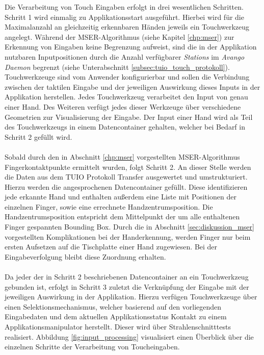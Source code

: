 Die Verarbeitung von Touch Eingaben erfolgt in drei wesentlichen Schritten. Schritt 1 wird einmalig zu Applikationsstart ausgeführt. Hierbei wird für die Maximalanzahl an gleichzeitig erkennbaren Händen jeweils ein Touchwerkzeug angelegt. Während der MSER-Algorithmus (siehe Kapitel \ref{chp:mser}) zur Erkennung von Eingaben keine Begrenzung aufweist, sind die in der Applikation nutzbaren Inputpositionen durch die Anzahl verfügbarer \emph{Stations} im \emph{Avango Daemon} begrenzt (siehe Unterabschnitt \ref{subsec:tuio_touch_protokoll}). Touchwerkzeuge sind vom Anwender konfigurierbar und sollen die Verbindung zwischen der taktilen Eingabe und der jeweiligen Auswirkung dieses Inputs in der Applikation herstellen. Jedes Touchwerkzeug verarbeitet den Input von genau einer Hand. Des Weiteren verfügt jedes dieser Werkzeuge über verschiedene Geometrien zur Visualisierung der Eingabe. Der Input einer Hand wird als Teil des Touchwerkzeugs in einem Datencontainer gehalten, welcher bei Bedarf in Schritt 2 gefüllt wird.
\\\\
Sobald durch den in Abschnitt \ref{chp:mser} vorgestellten MSER-Algorithmus Fingerkontaktpunkte ermittelt wurden, folgt Schritt 2. An dieser Stelle werden die Daten aus dem TUIO Protokoll Transfer ausgewertet und umstrukturiert. Hierzu werden die angesprochenen Datencontainer gefüllt. Diese identifizieren jede erkannte Hand und enthalten außerdem eine Liste mit Positionen der einzelnen Finger, sowie eine errechnete Handzentrumsposition. Die Handzentrumsposition entspricht dem Mittelpunkt der um alle enthaltenen Finger gespannten Bounding Box. Durch die in Abschnitt \ref{sec:diskussion_mser} vorgestellten Komplikationen bei der Handerkennung, werden Finger nur beim ersten Aufsetzen auf die Tischplatte einer Hand zugewiesen. Bei der Eingabeverfolgung bleibt diese Zuordnung erhalten.
\\\\
Da jeder der in Schritt 2 beschriebenen Datencontainer an ein Touchwerkzeug gebunden ist, erfolgt in Schritt 3 zuletzt die Verknüpfung der Eingabe mit der jeweiligen Auswirkung in der Applikation. Hierzu verfügen Touchwerkzeuge über einen Selektionsmechanismus, welcher basierend auf den vorliegenden Eingabedaten und dem aktuellen Applikationsstatus Kontakt zu einem Applikationsmanipulator herstellt. Dieser wird über Strahlenschnitttests realisiert. Abbildung \ref{fig:input_processing} visualisiert einen Überblick über die einzelnen Schritte der Verarbeitung von Toucheingaben.


